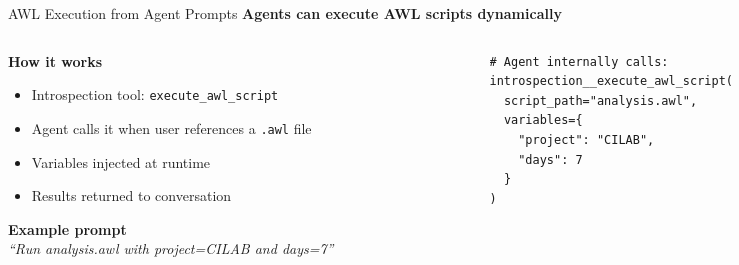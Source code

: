 \documentclass[aspectratio=169,10pt]{beamer}
\begin{document}
\begin{frame}[fragile]{AWL Execution from Agent Prompts}
\textbf{\small Agents can execute AWL scripts dynamically}

\smallskip
\begin{columns}[T]
\begin{column}{0.48\textwidth}
\textbf{How it works}
\begin{itemize}\scriptsize\setlength{\itemsep}{1pt}
  \item Introspection tool: \texttt{execute\_awl\_script}
  \item Agent calls it when user references a \texttt{.awl} file
  \item Variables injected at runtime
  \item Results returned to conversation
\end{itemize}

\smallskip
\textbf{Example prompt}\\
{\scriptsize\textit{``Run analysis.awl with project=CILAB and days=7''}}
\end{column}
\begin{column}{0.48\textwidth}
\begin{lstlisting}[style=code,language={}]
# Agent internally calls:
introspection__execute_awl_script(
  script_path="analysis.awl",
  variables={
    "project": "CILAB",
    "days": 7
  }
)
\end{lstlisting}
\end{column}
\end{columns}
\end{frame}
\end{document}
